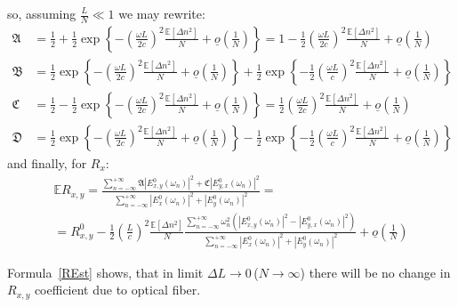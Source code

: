 \documentclass[12pt, notitlepage]{report}
\begin{document}
so, assuming $\frac{L}{N} \ll 1$ we may rewrite:
\begin{align*}
	\mathfrak{A} &= \frac{1}{2} + \frac{1}{2}\exp\left\{ -\left(\frac{\omega L}{2c}\right)^2\frac{\mathbb{E}\left[\Delta n^2\right]}{N} + \underline{o}\left(\frac{1}{N}\right) \right\} = 1 -\frac{1}{2}\left(\frac{\omega L}{2c}\right)^2\frac{\mathbb{E}\left[\Delta n^2\right]}{N} + \underline{o}\left(\frac{1}{N}\right) \\
	\mathfrak{B} &= \frac{1}{2}\exp\left\{ -\left(\frac{\omega L}{2c}\right)^2\frac{\mathbb{E}\left[\Delta n^2\right]}{N} + \underline{o}\left(\frac{1}{N}\right) \right\} + \frac{1}{2}\exp\left\{-\frac{1}{2} \left(\frac{\omega L}{c}\right)^2\frac{\mathbb{E}\left[\Delta n^2\right]}{N} + \underline{o}\left(\frac{1}{N}\right) \right\} \\
	\mathfrak{C} &= \frac{1}{2} - \frac{1}{2} \exp\left\{ -\left(\frac{\omega L}{2c}\right)^2\frac{\mathbb{E}\left[\Delta n^2\right]}{N} + \underline{o}\left(\frac{1}{N}\right) \right\} = \frac{1}{2}\left(\frac{\omega L}{2c}\right)^2\frac{\mathbb{E}\left[\Delta n^2\right]}{N} + \underline{o}\left(\frac{1}{N}\right) \\
	\mathfrak{D} &= \frac{1}{2}\exp\left\{ -\left(\frac{\omega L}{2c}\right)^2\frac{\mathbb{E}\left[\Delta n^2\right]}{N} + \underline{o}\left(\frac{1}{N}\right) \right\} - \frac{1}{2}\exp\left\{-\frac{1}{2} \left(\frac{\omega L}{c}\right)^2\frac{\mathbb{E}\left[\Delta n^2\right]}{N} + \underline{o}\left(\frac{1}{N}\right) \right\}
\end{align*}
and finally, for $R_x$:
\begin{multline}
	\label{REst}
	\mathbb{E}R_{x,y} = \frac{\sum\limits_{n=-\infty}^{+\infty} \mathfrak{A}\left|E^0_{x,y}(\omega_n)\right|^2 + \mathfrak{C}\left|E^0_{y,x}(\omega_n)\right|^2}{\sum\limits_{n=-\infty}^{+\infty} \left|E_x^0(\omega_n)\right|^2 + \left|E_y^0(\omega_n)\right|^2} = \\ =
	R^0_{x,y} - \frac{1}{2}\left(\frac{L}{c}\right)^2\frac{\mathbb{E}\left[\Delta n^2\right]}{N} \frac{\sum\limits_{n=-\infty}^{+\infty} \omega_n^2\left(\left|E^0_{x,y}(\omega_n)\right|^2 - \left|E^0_{y,x}(\omega_n)\right|^2\right)}{\sum\limits_{n=-\infty}^{+\infty} \left|E_x^0(\omega_n)\right|^2 + \left|E_y^0(\omega_n)\right|^2} + \underline{o}\left(\frac{1}{N}\right)
\end{multline}

Formula~\eqref{REst} shows, that in limit $\Delta L \rightarrow 0$\,($N\rightarrow \infty$) there will be no change in $R_{x,y}$ coefficient due to optical fiber.
\end{document}
